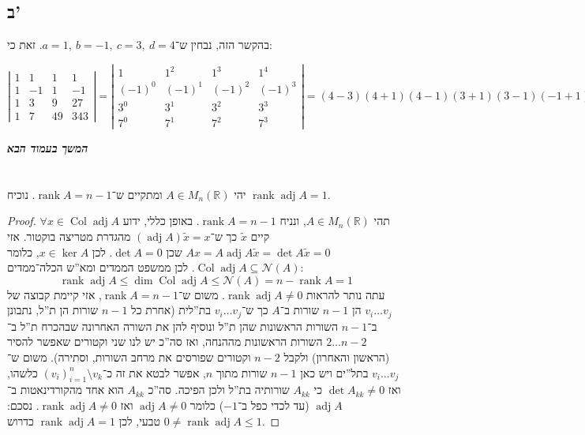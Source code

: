 \documentclass[]{article}
\newcommand\npage {\vfil {\hfil \textbf{\textit{המשך בעמוד הבא}}} \hfil \vfil \pagebreak}
\newcommand\R     {\mathbb{R}}
\newcommand\nc    {\mathcal{N}}
\DeclareMathOperator{\adj}    {adj}
\DeclareMathOperator{\rk}     {rank}
\DeclareMathOperator{\col}    {Col}
\newcommand\detms[1]    {\sof{\begin{matrix}
            #1
\end{matrix}}}
\newcommand\tl    {\tilde}
\newcommand\sof[1]    {\left | #1 \right |}
\theoremstyle{definition}
\begin{document}
    \subsection*{ב'}                                                                                                                                                  
    בהקשר הזה, נבחין ש־$a = 1, \ b = -1, \ c = 3, \ d = 4$. זאת כי: 
    
    \[ \detms{1 &1 & 1 & 1 \\ 1 & -1 & 1 & -1 \\ 1 & 3 & 9 & 27 \\ 1 & 7 & 49 & 343} = \detms{1 & 1^2 & 1^3 & 1^4 \\ (-1)^{0} & (-1)^{1} & (-1)^{2} & (-1)^{3} \\ 3^{0} & 3^{1} & 3^{2} & 3^{3} \\ 7^{0} & 7^{1} & 7^{2} & 7^{3}} = (4 - 3)(4 + 1)(4 - 1)(3 + 1)(3 - 1)(-1 + 1) = 0 \]
    
    
    \npage
    \section{}
    יהי $A \in M_n(\R)$ ומתקיים ש־$\rk A = n - 1$. נוכיח $\rk \adj A =1$. \begin{proof}
        תהי $A  \in M_n(\R)$, ונניח $\rk A = n - 1$. באופן כללי, ידוע $\forall x \in \col \adj A$ קיים $\tl x$ כך ש־$(\adj A)\tl x = x$ מהגדרת מטריצה בוקטור. אזי $Ax = A \adj A \tl x = \det A \tl x = 0$ שכן $\det A = 0$. לכן $x \in \ker A$, כלומר $\col \adj A \subseteq \nc(A)$. לכן ממשפט הממדים ומא''ש הכלה־ממדים: 
        \[ \rk \adj A \le \dim \col \adj A \le \nc(A) = n - \rk A = 1 \]
        עתה נותר להראות $\rk \adj A \neq 0$. משום ש־$\rk A = n - 1$, אזי קיימת קבוצה של $v_i \dots v_j$ הן $n - 1$ שורות ב־$A$ כך ש־$v_i \dots v_j$ בת''לית (אחרת כל $n - 1$ שורות הן ת''ל, נתבונן ב־$n - 1$ השורות הראשונות שהן ת''ל ונוסיף להן את השורה האחרונה שבהכרח ת''ל ב־$2 \dots n - 2$ השורות הראשונות מההנחה, ואז סה''כ יש לנו שני וקטורים שאפשר להסיר (הראשון והאחרון) ולקבל $n - 2$ וקטורים שפורסים את מרחב השורות, וסתירה). משום ש־$v_i \dots v_j$ בתל''ים ויש כאן $n - 1$ שורות מתוך $n$, אפשר לבטא את זה כ־$(v_i)_{i = 1}^{n} \setminus v_k$ כלשהו, ואז $\det A_{kk} \neq 0$ כי $A_{kk}$ שורותיה בת''ל ולכן הפיכה. סה''כ $A_{kk}$ הוא אחד מהקורדינאטות ב־$\adj A$ (עד לכדי כפל ב־$-1$) כלומר $\adj A \neq 0$ ואז $\rk \adj A \neq 0$. נסכם: $0 \neq \rk \adj A \le 1$ טבעי, לכן $\rk \adj A = 1$ כדרוש. 
    \end{proof}
    
\end{document}
